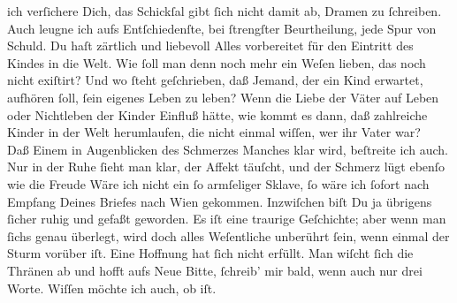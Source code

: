 \begin{ledgroupsized}[t]{13cm}
               ich verſichere Dich, das Schickſal gibt ſich nicht damit ab, Dramen zu ſchreiben.\pend
           \pstart
           Auch leugne ich aufs Entſchiedenſte, bei ſtrengſter Beurtheilung, jede Spur von
               Schuld. Du haſt zärtlich und liebevoll Alles vorbereitet für den Eintritt des Kindes in die Welt. Wie ſoll
               man denn noch mehr ein Weſen lieben, das noch nicht exiſtirt? Und wo ſteht
               geſchrieben, daß Jemand, der ein Kind erwartet, aufhören {\pb}ſoll, ſein eigenes Leben zu leben? Wenn die Liebe
               der Väter auf Leben oder Nichtleben der Kinder Einfluß hätte, wie kommt es dann, daß
               zahlreiche Kinder in der Welt herumlaufen, die nicht einmal wiſſen, wer ihr Vater
                  war? {\dotsfive}\pend
           \pstart
           Daß Einem in Augenblicken des Schmerzes Manches klar wird, beſtreite ich auch. Nur in
               der Ruhe ſieht man klar, der Affekt täuſcht, und der Schmerz lügt ebenſo wie die
                  Freude{\dotsfour}\pend
           \pstart
           Wäre ich nicht ein ſo armſeliger Sklave, ſo wäre ich ſofort nach Empfang Deines
               Briefes {\pb}nach Wien gekommen. Inzwiſchen biſt Du ja übrigens ſicher ruhig und gefaßt
               geworden. Es iſt eine traurige Geſchichte; aber wenn man ſichs genau überlegt, wird
               doch alles Weſentliche unberührt ſein, wenn einmal der Sturm vorüber iſt. Eine
               Hoffnung hat ſich nicht erfüllt. Man wiſcht ſich die Thränen ab und hofft aufs Neue{\dotsfour}\pend
           \pstart
           Bitte, ſchreib’ mir bald, wenn auch nur drei Worte. Wiſſen möchte ich auch, ob
                  \label{K_L02827-2v}\label{K_L02827-2h} iſt.\pend

\end{ledgroupsized}
